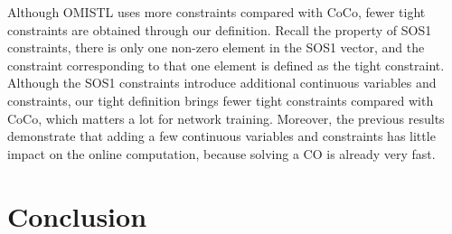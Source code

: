 \documentclass[a4paper]{report}
\begin{document}
    Although OMISTL uses more constraints compared with CoCo, fewer tight constraints are obtained through our definition. Recall the property of SOS1 constraints, there is only one non-zero element in the SOS1 vector, and the constraint corresponding to that one element is defined as the tight constraint. Although the SOS1 constraints introduce additional continuous variables and constraints, our tight definition brings fewer tight constraints compared with CoCo, which matters a lot for network training. Moreover, the previous results demonstrate that adding a few continuous variables and constraints has little impact on the online computation, because solving a CO is already very fast. 
    

\begin{table}[]
    \begin{center}
    
        \caption[]{Comparison of constraints}
        \label{tight_constraints}
    \end{center}
    \end{table}

\chapter{Conclusion}
\end{document}
